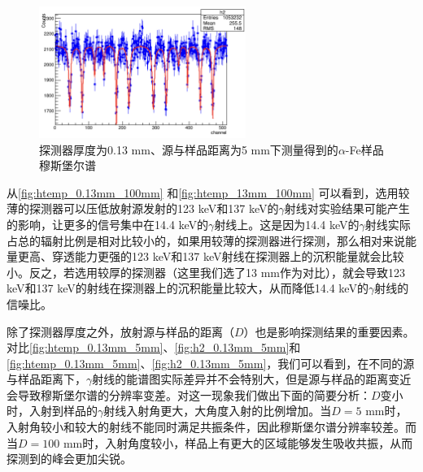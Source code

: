\documentclass[font=default]{mpltx}
\begin{document}
\begin{figure}[h]
  \centering
  \includegraphics[width=0.6\textwidth]{fig/DistSource/5mm/h2.png}
  \caption{探测器厚度为0.13 mm、源与样品距离为5 mm下测量得到的$\alpha$-Fe样品穆斯堡尔谱}
  \label{fig:h2_0.13mm_5mm}
\end{figure}

从\autoref{fig:htemp_0.13mm_100mm} 和\autoref{fig:htemp_13mm_100mm} 可以看到，选用较薄的探测器可以压低放射源发射的123 keV和137 keV的$\gamma$射线对实验结果可能产生的影响，让更多的信号集中在14.4 keV的$\gamma$射线上。这是因为14.4 keV的$\gamma$射线实际占总的辐射比例是相对比较小的，如果用较薄的探测器进行探测，那么相对来说能量更高、穿透能力更强的123 keV和137 keV射线在探测器上的沉积能量就会比较小。反之，若选用较厚的探测器（这里我们选了13 mm作为对比），就会导致123 keV和137 keV的射线在探测器上的沉积能量比较大，从而降低14.4 keV的$\gamma$射线的信噪比。

除了探测器厚度之外，放射源与样品的距离（$D$）也是影响探测结果的重要因素。对比\autoref{fig:htemp_0.13mm_5mm}、\autoref{fig:h2_0.13mm_5mm}和\autoref{fig:htemp_0.13mm_5mm}、\autoref{fig:h2_0.13mm_5mm}，我们可以看到，在不同的源与样品距离下，$\gamma$射线的能谱图实际差异并不会特别大，但是源与样品的距离变近会导致穆斯堡尔谱的分辨率变差。对这一现象我们做出下面的简要分析：$D$变小时，入射到样品的$\gamma$射线入射角更大，大角度入射的比例增加。当$D=5$ mm时，入射角较小和较大的射线不能同时满足共振条件，因此穆斯堡尔谱分辨率较差。而当$D=100$ mm时，入射角度较小，样品上有更大的区域能够发生吸收共振，从而探测到的峰会更加尖锐。
\end{document}
